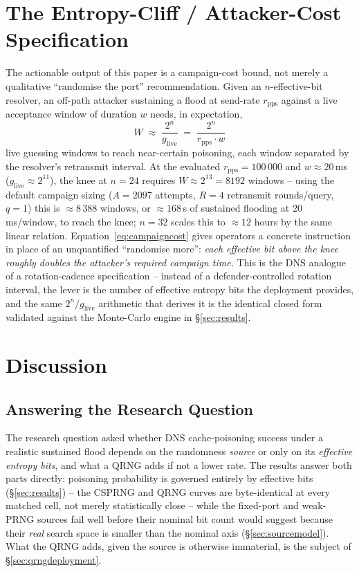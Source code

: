 \documentclass[conference]{IEEEtran}
\begin{document}
\section{The Entropy-Cliff / Attacker-Cost Specification}
\label{sec:rotspec}

The actionable output of this paper is a campaign-cost bound, not merely a qualitative ``randomise the
port'' recommendation. Given an $n$-effective-bit resolver, an off-path attacker sustaining a flood at
send-rate $r_{\mathrm{pps}}$ against a live acceptance window of duration $w$ needs, in expectation,
\begin{equation}
W \;\approx\; \frac{2^{n}}{g_{\mathrm{live}}} \;=\; \frac{2^{n}}{r_{\mathrm{pps}} \cdot w}
\label{eq:campaigncost}
\end{equation}
live guessing windows to reach near-certain poisoning, each window separated by the resolver's retransmit
interval. At the evaluated $r_{\mathrm{pps}} = 100\,000$ and $w \approx 20$\,ms
($g_{\mathrm{live}} \approx 2^{11}$), the knee at $n = 24$ requires $W \approx 2^{13} = 8192$ windows --
using the default campaign sizing ($A = 2097$ attempts, $R = 4$ retransmit rounds/query, $q=1$) this is
$\approx 8\,388$ windows, or $\approx 168$\,s of sustained flooding at $20$\,ms/window, to reach the knee;
$n = 32$ scales this to $\approx 12$ hours by the same linear relation. Equation~\ref{eq:campaigncost}
gives operators a concrete instruction in place of an unquantified ``randomise more'': \emph{each effective
bit above the knee roughly doubles the attacker's required campaign time.} This is the DNS analogue of a
rotation-cadence specification -- instead of a defender-controlled rotation interval, the lever is the
number of effective entropy bits the deployment provides, and the same $2^{n}/g_{\mathrm{live}}$ arithmetic
that derives it is the identical closed form validated against the Monte-Carlo engine in
\S\ref{sec:results}.

\section{Discussion}
\label{sec:discussion}

\subsection{Answering the Research Question}

The research question asked whether DNS cache-poisoning success under a realistic sustained flood depends
on the randomness \emph{source} or only on its \emph{effective entropy bits}, and what a QRNG adds if not
a lower rate. The results answer both parts directly: poisoning probability is governed entirely by
effective bits (\S\ref{sec:results}) -- the CSPRNG and QRNG curves are byte-identical at every matched
cell, not merely statistically close -- while the fixed-port and weak-PRNG sources fail well before their
nominal bit count would suggest because their \emph{real} search space is smaller than the nominal axis
(\S\ref{sec:sourcemodel}). What the QRNG adds, given the source is otherwise immaterial, is the subject of
\S\ref{sec:qrngdeployment}.
\end{document}
